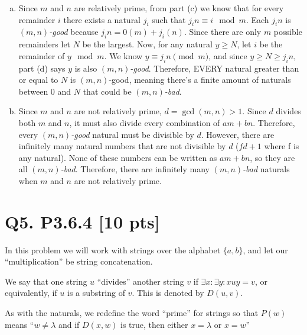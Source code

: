 \documentclass[12pt]{article}
\begin{document}
\begin{enumerate}[(a)]
		\item Since $m$ and $n$ are relatively prime, from part (c) we know that for
			every remainder $i$ there exists a natural $j_{i}$ such that
			$j_{i} n\equiv i\mod m$. Each $j_{i} n$ is {\em $(m,n)$-good} because $j_{i}
			n=0(m)+j_{i}(n)$. Since there are only $m$ possible remainders let $N$ be
			the largest. Now, for any natural $y\geq N$, let $i$ be the remainder of $y
			\mod m$. We know $y\equiv j_{i} n\pmod m$, and since $y\geq N\geq j_{i} n$,
			part (d) says $y$ is also {\em $(m,n)$-good}. Therefore, EVERY natural
			greater than or equal to $N$ is $(m,n)$-good, meaning there's a finite amount
			of naturals between 0 and $N$ that could be {\em $(m,n)$-bad}.

		\item Since $m$ and $n$ are not relatively prime, $d=\gcd(m,n)>1$. Since $d$
			divides both $m$ and $n$, it must also divide every combination of $am+bn$.
			Therefore, every {\em $(m,n)$-good} natural must be divisible by $d$. However,
			there are infinitely many natural numbers that are not divisible by $d$ ($f
			d+1$ where f is any natural). None of these numbers can be written as $am+b
			n$, so they are all {\em $(m,n)$-bad}. Therefore, there are infinitely
			many {\em $(m,n)$-bad} naturals when $m$ and $n$ are not relatively prime.
	\end{enumerate}

	\newpage

	\section*{\textbf{Q5. P3.6.4} [10 pts]}
	In this problem we will work with strings over the alphabet $\{a, b\}$, and
	let our “multiplication” be string concatenation.

	We say that one string $u$ “divides” another string $v$ if
	$\exists x : \exists y : xuy = v$, or equivalently, if $u$ is a substring of
	$v$. This is denoted by $D(u,v)$.

	As with the naturals, we redefine the word “prime” for strings so that $P(w)$
	means “$w \not = \lambda$ and if $D(x,w)$ is true, then either $x = \lambda$
	or $x = w$”
\end{document}
